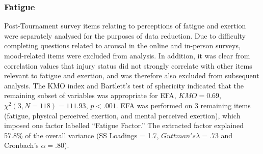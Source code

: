 \begin{CJK}{UTF8}{gbsn}







%    
%    

%    
%    
%    







\subsubsection{Fatigue \label{app8:fatigueEFA}}

Post-Tournament survey items relating to perceptions of fatigue and exertion were separately analysed for the purposes of data reduction.  Due to difficulty completing questions related to arousal in the online and in-person surveys, mood-related items were excluded from analysis.  In addition, it was clear from correlation values that injury status did not strongly correlate with other items relevant to fatigue and exertion, and was therefore also excluded from subsequent analysis.  The KMO index and Bartlett's test of sphericity indicated that the remaining subset of variables was appropriate for EFA, $KMO =  0.69$, $\chi^2(3, N = 118) = 111.93$, $p < .001$. EFA was performed on 3 remaining items (fatigue, physical perceived exertion, and mental perceived exertion), which imposed one factor labelled ``Fatigue Factor.''  The extracted factor explained 57.8\% of the overall variance (SS Loadings = 1.7, $Guttman's\lambda =.73$ and Cronbach's $\alpha = .80$).


\end{CJK}
